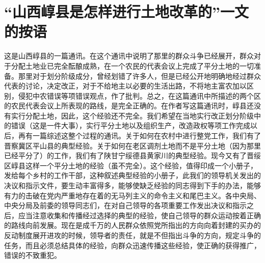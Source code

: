 \section[ “山西崞县是怎样进行土地改革的”一文的按语（一九四八年三月十二日）]{ “山西崞县是怎样进行土地改革的”一文的按语}


这是山西崞县的一篇通讯。在这个通讯中说明了那里的群众斗争已经展开，群众对于分配土地业已完全酝酿成熟，在一个农民的代表会议上完成了平分土地的一切准备。那里对于划分阶级成分，曾经划错了许多人，但是已经公开地明确地经过群众代表的讨论，决定改正，对于不给地主以必要的生活出路，不将地主富农加以区别，侵犯中农错误等项错误观点，作了批判。总之，在这篇通讯中所描述的两个区的农民代表会议上所表现的路线，是完全正确的。在作者写这篇通讯时，崞县还没有实行分配土地，因此，这个经验还不完全。我们希望在当地实行改正划分阶级中的错误（这是一件大事），实行平分土地以及组织生产，改造政权等项工作完成以后，再有一篇综述这整个过程的通讯。关于如何在农村中进行整党工作，我们有了晋察冀区平山县的典型经验。关于如何在老区调剂土地而不是平分土地（因为那里已经平分了）的工作，我们有了陕甘宁绥德县黄家川的典型经验。现今又有了晋绥区崞县这样一个平分土地的经验（虽不完全）。这个经验，值得印成一个小册子，发给每个乡村的工作干部，这种叙述典型经验的小册子，此我们的领导机关发出的决议和指示文件，要生动丰富得多，能够使缺乏经验的同志得到下手的办法，能够有力的击破在党内严重地存在着的无马列主义的命令主义和尾巴主义。各中央局、中央分局及前委的领导同志们，在对自己领导的各项重要工作发出决议和指示之后，应当注意收集和传播经过选择的典型的经验，使自己领导的群众运动按着正确的路线向前发展。现在是成千万的人民群众依照党所指出的方向向着封建的买办的反动制度展开进攻的时候，领导者的责任，就是不但指出斗争的方向，规定斗争的任务，而且必须总结具体的经验，向群众迅速传播这些经验，使正确的获得推广，错误的不致重犯。

